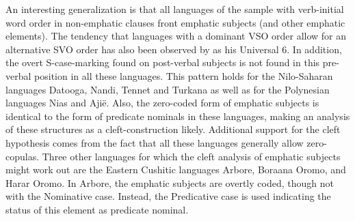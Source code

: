 \enlargethispage{\baselineskip}%
An interesting generalization is that all languages of the sample with verb-initial word order in non-emphatic clauses front emphatic subjects (and other emphatic elements). 
The tendency that languages with a dominant VSO order allow for an alternative SVO order has also been observed by \citet{Greenberg:1963} as his Universal 6. 
In addition, the overt S-case-marking found on post-verbal subjects is not found in this pre-verbal position in all these languages. 
This pattern holds for the Nilo-Saharan languages Datooga, Nandi, Tennet and Turkana as well as for the Polynesian languages Nias and Aji\"e. 
Also, the zero-coded form of emphatic subjects is identical to the form of predicate nominals in these languages, making an analysis of these structures as a cleft-construction likely. Additional support for the cleft hypothesis comes from the fact that all these languages generally allow zero-copulas. 
Three other languages for which the cleft analysis of emphatic subjects might work out are the Eastern Cushitic languages Arbore, Boraana Oromo, and Harar Oromo. 
In Arbore, the emphatic subjects are overtly coded, though not with the Nominative case. 
Instead, the Predicative case is used indicating the status of this element as predicate nominal.  

